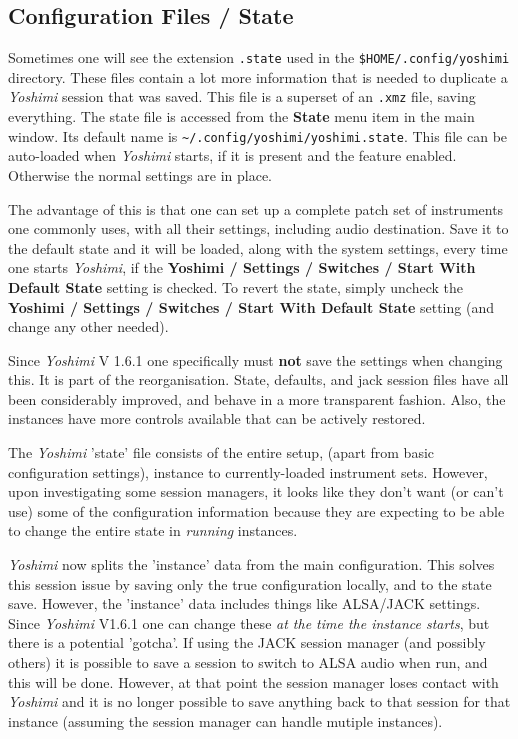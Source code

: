 \subsection{Configuration Files / State}
\label{subsec:configuration_state}

   Sometimes one will see the extension \texttt{.state} used in the
   \texttt{\$HOME/.config/yoshimi} directory.  These files contain a lot
   more information that is needed to duplicate a \textsl{Yoshimi} session
   that was saved.  This file is a superset of an \texttt{.xmz} file,
   saving everything.
   The state file is accessed from the \textbf{State} menu item in the main
   window.
   Its default name is
   \texttt{\textasciitilde/.config/yoshimi/yoshimi.state}.
   This file can be auto-loaded when \textsl{Yoshimi} starts, if it is
   present and the feature enabled. Otherwise the normal settings are in
   place.

   The advantage of this is that one can set up a complete patch set of
   instruments one commonly uses, with all their settings, including audio
   destination.  Save it to the default state and it will be loaded, along
   with the system settings, every time one starts \textsl{Yoshimi}, if the
   \textbf{Yoshimi / Settings / Switches / Start With Default State}
   setting is checked. To revert the state, simply uncheck the
   \textbf{Yoshimi / Settings / Switches / Start With Default State}
   setting (and change any other needed).

   Since \textsl{Yoshimi} V 1.6.1 one specifically must \textbf{not} save
   the settings when changing this. It is part of the reorganisation.
   State, defaults, and jack session files have all been considerably
   improved, and behave in a more transparent fashion. Also, the instances
   have more controls available that can be actively restored.

   The \textsl{Yoshimi} 'state' file consists of the entire setup, (apart
   from basic configuration settings), instance to currently-loaded
   instrument sets. However, upon investigating some session managers, it
   looks like they don't want (or can't use) some of the configuration
   information because they are expecting to be able to change the entire
   state in \textsl{running} instances.

   \textsl{Yoshimi} now splits the 'instance' data
   from the main configuration.  This solves this session issue
   by saving only the true configuration locally, and to the state save.
   However, the 'instance' data includes things like ALSA/JACK settings.
   Since \textsl{Yoshimi} V1.6.1 one can change these
   \textsl{at the time the instance starts}, but there is a potential
   'gotcha'. If using the JACK session manager (and possibly others) it is
   possible to save a session to switch to ALSA audio when run, and this
   will be done. However, at that point the session manager loses contact
   with \textsl{Yoshimi} and it is no longer possible to save anything
   back to that session for that instance (assuming the session manager can
   handle mutiple instances).

